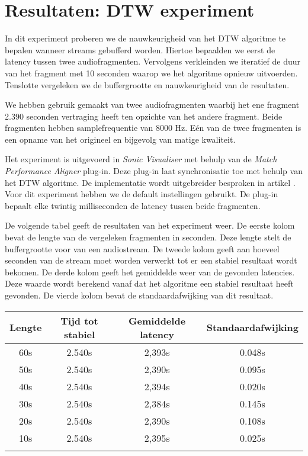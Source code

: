 \chapter{Resultaten: DTW experiment}
\label{appendix-a}

In dit experiment proberen we de nauwkeurigheid van het DTW algoritme te bepalen wanneer streams gebufferd worden. Hiertoe bepaalden we eerst de latency tussen twee audiofragmenten. Vervolgens verkleinden we iteratief de duur van het fragment met 10 seconden waarop we het algoritme opnieuw uitvoerden. Tenslotte vergeleken we de buffergrootte en nauwkeurigheid van de resultaten.

We hebben gebruik gemaakt van twee audiofragmenten waarbij het ene fragment 2.390 seconden vertraging heeft ten opzichte van het andere fragment. Beide fragmenten hebben samplefrequentie van 8000 Hz. Eén van de twee fragmenten is een opname van het origineel en bijgevolg van matige kwaliteit.

Het experiment is uitgevoerd in \textit{Sonic Visualiser} met behulp van de \textit{Match Performance Aligner} plug-in. Deze plug-in laat synchronisatie toe met behulp van het DTW algoritme. De implementatie wordt uitgebreider besproken in artikel \cite{dixon2005match}. Voor dit experiment hebben we de default instellingen gebruikt. De plug-in bepaalt elke twintig milliseconden de latency tussen beide fragmenten.

De volgende tabel geeft de resultaten van het experiment weer. De eerste kolom bevat de lengte van de vergeleken fragmenten in seconden. Deze lengte stelt de buffergrootte voor van een audiostream. De tweede kolom geeft aan hoeveel seconden van de stream moet worden verwerkt tot er een stabiel resultaat wordt bekomen. De derde kolom geeft het gemiddelde weer van de gevonden latencies. Deze waarde wordt berekend vanaf dat het algoritme een stabiel resultaat heeft gevonden. De vierde kolom bevat de standaardafwijking van dit resultaat.\\

\begin{center}
\begin{tabular}{ c  c  c  c }
	\hline
	\textbf{Lengte} & \textbf{Tijd tot stabiel} & \textbf{Gemiddelde latency} & \textbf{Standaardafwijking} \\
	\hline
	60s & 2.540s & 2,393s & 0.048s \\
	50s & 2.540s & 2,390s & 0.095s \\
	40s & 2.540s & 2,394s & 0.020s \\
	30s & 2.540s & 2,384s & 0.145s \\
	20s & 2.540s & 2,390s & 0.108s \\
	10s & 2.540s & 2,395s & 0.025s \\
	\\
\end{tabular}\\
\end{center}

